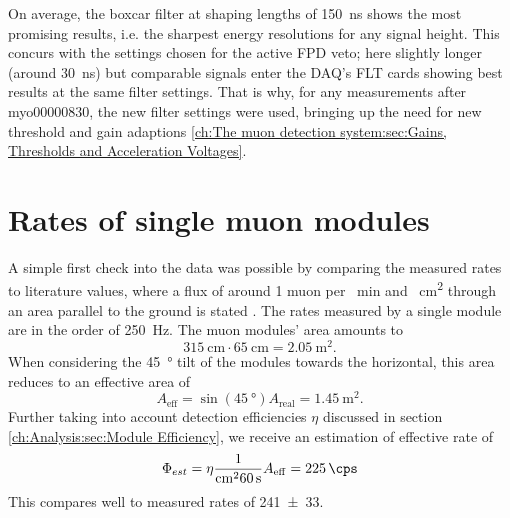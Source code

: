   On average, the boxcar filter at shaping lengths of \SI{150}{\nano\second} shows the most promising results, i.e. the sharpest energy resolutions for any signal height. This concurs with the settings chosen for the active FPD veto; here slightly longer (around \SI{30}{\nano\second}) but comparable signals enter the DAQ's FLT cards showing best results at the same filter settings\cite{KevinWierman}.
  That is why, for any measurements after myo00000830, the new filter settings were used, bringing up the need for new threshold and gain adaptions \ref{ch:The muon detection system:sec:Gains, Thresholds and Acceleration Voltages}. 
  
  \section{Rates of single muon modules}
  \label{ch:Analysis:sec:Muon module's rates}
  A simple first check into the data was possible by comparing the measured rates to literature values, where a flux of around 1 muon per \SI{}{\minute} and \SI{}{\square\centi\meter} through an area parallel to the ground is stated \cite{muonFlux}. The rates measured by a single module are in the order of \SI{250}{\hertz}. The muon modules' area amounts to
  \begin{equation}
  	\SI{315}{\centi\meter} \cdot \SI{65}{\centi\meter} = \SI{2.05}{\square\meter}.
  \end{equation}
  When considering the \SI{45}{\degree} tilt of the modules towards the horizontal, this area reduces to an effective area of 
  \begin{equation}
  	A_{\mathrm{eff}} = \sin{\left(\SI{45}{\degree}\right)} A_{\mathrm{real}} = \SI{1.45}{\square\meter}.
  \end{equation}
  Further taking into account detection efficiencies $\eta$ discussed in section \ref{ch:Analysis:sec:Module Efficiency}, we receive an estimation of effective rate of
  \begin{equation}
  	\Phi_{est} = \eta \frac{1}{\SI{}{\square\centi\meter}\SI{60}{\second}}A_{\mathrm{eff}} = \SI{225}{\cps}
  \end{equation}
  This compares well to measured rates of \SI{241\pm33}{\cps}.
  
